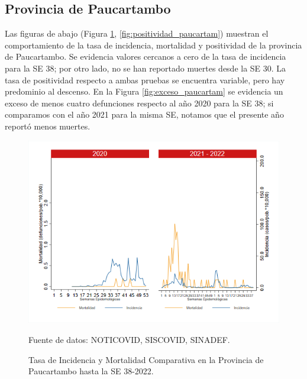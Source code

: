 \documentclass[12pt,a4paper,openany]{book}
\begin{document}
	\subsection*{Provincia de Paucartambo}
	\noindent Las figuras de abajo (Figura \ref{fig:inc_mort_paucartam}, \ref{fig:positividad_paucartam}) muestran el comportamiento de la tasa de incidencia, mortalidad y positividad de la provincia de Paucartambo. Se evidencia valores cercanos a cero de la tasa de incidencia para la SE 38; por otro lado, no se han reportado muertes desde la SE 30. La tasa de positividad respecto a ambas pruebas se encuentra variable, pero hay predominio al descenso.
	En la Figura \ref{fig:exceso_paucartam} se evidencia un exceso de menos cuatro defunciones respecto al año 2020 para la SE 38; si comparamos con el año 2021 para la misma SE, notamos que el presente año reportó menos muertes.
	\begin{figure}[h]
		\caption{Tasa de Incidencia y Mortalidad Comparativa en la Provincia de Paucartambo hasta la SE 38-2022.}\label{fig:inc_mort_paucartam}
		\begin{center}
			\includegraphics[width=0.85\linewidth]{../figuras/incidencia_mortalidad_20_21_11.png}
		\end{center}
		{\footnotesize {Fuente de datos: NOTICOVID, SISCOVID, SINADEF.}}
	\end{figure}
	
\end{document}
